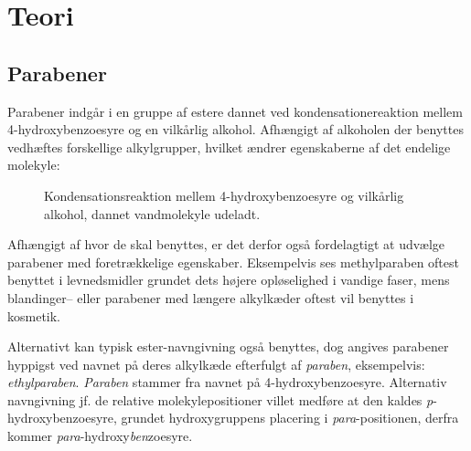 \section{Teori}
    \subsection{Parabener}
    Parabener indgår i en gruppe af estere dannet ved kondensationereaktion mellem 4-hydroxybenzoesyre og en vilkårlig alkohol. Afhængigt af alkoholen der benyttes vedhæftes forskellige alkylgrupper, hvilket ændrer egenskaberne af det endelige molekyle:
    \begin{figure}[H]
        \caption{Kondensationsreaktion mellem 4-hydroxybenzoesyre og vilkårlig alkohol, dannet vandmolekyle udeladt.}
    \end{figure}
    Afhængigt af hvor de skal benyttes, er det derfor også fordelagtigt at udvælge parabener med foretrækkelige egenskaber. Eksempelvis ses methylparaben oftest benyttet i levnedsmidler grundet dets højere opløselighed i vandige faser, mens blandinger-- eller parabener med længere alkylkæder oftest vil benyttes i kosmetik.
    \begin{table}[H]
        \caption{Fysiske egenskaber af forskellige parabener \parencite{PubChem}.}
    \end{table}
    Alternativt kan typisk ester-navngivning også benyttes, dog angives parabener hyppigst ved navnet på deres alkylkæde efterfulgt af \textit{paraben}, eksempelvis: \textit{ethylparaben}. \textit{Paraben} stammer fra navnet på 4-hydroxybenzoesyre. Alternativ navngivning jf. de relative molekylepositioner villet medføre at den kaldes \textit{p}-hydroxybenzoesyre, grundet hydroxygruppens placering i \textit{para}-positionen, derfra kommer \textit{para}-hydroxy\textit{ben}zoesyre.

